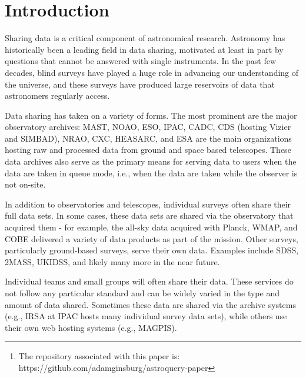 \documentclass[twocolumn]{aastex61}
\begin{document}



\begin{abstract}
Astroquery is a collection of tools for requesting data from databases hosted
on the internet, particularly those with web pages but without formal
application program interfaces (APIs).  These tools are based on the Python
requests module, which is used to make HTTP requests, and astropy, which
provides most of the data parsing functionality.  Astroquery has received
significant contributions from the broader astronomical community, including
several significant contributions from telescope archives.
\footnote{
The repository associated with this paper is:
https://github.com/adamginsburg/astroquery-paper
}
\end{abstract}


\section{Introduction}
Sharing data is a critical component of astronomical research.  Astronomy
has historically been a leading field in data sharing, motivated at least
in part by questions that cannot be answered with single instruments.
In the past few decades, blind surveys have played a huge role in advancing our
understanding of the universe, and these surveys have produced large reservoirs
of data that astronomers regularly access.

Data sharing has taken on a variety of forms.  The most prominent are the major
observatory archives: MAST, NOAO, ESO, IPAC, CADC, CDS (hosting Vizier and
SIMBAD), NRAO, CXC, HEASARC, and ESA are the main
organizations hosting raw and processed data from ground and space based
telescopes.  These data archives also serve as the primary means for serving data
to users when the data are taken in queue mode, i.e., when the data are taken
while the observer is not on-site.

In addition to observatories and telescopes, individual surveys often share
their full data sets.  In some cases, these data sets are shared via the
observatory that acquired them - for example, the all-sky data acquired with
Planck, WMAP, and COBE delivered a variety of data products as part of the
mission.  Other surveys, particularly ground-based surveys, serve their own
data.  Examples include SDSS, 2MASS, UKIDSS, and likely many more in the near future.

Individual teams and small groups will often share their data.
These services do not follow any particular standard and can be widely
varied in the type and amount of data shared.  Sometimes these data
are shared via the archive systems (e.g., IRSA at IPAC hosts many
individual survey data sets), while others use their own web hosting
systems (e.g., MAGPIS).
\end{document}
